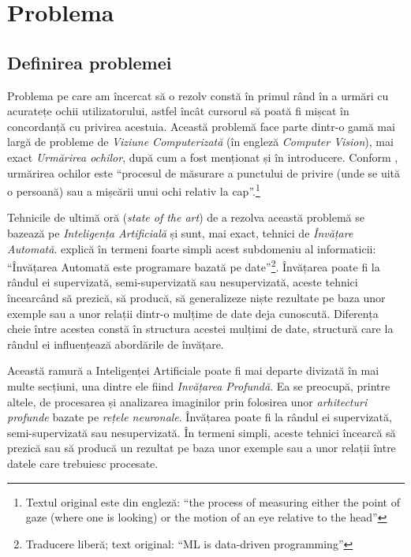 \chapter{Problema}

\section{Definirea problemei}

Problema pe care am încercat să o rezolv constă în primul rând în a urmări cu acuratețe ochii utilizatorului, astfel încât cursorul să poată fi mișcat în concordanță cu privirea acestuia.
Această problemă face parte dintr-o gamă mai largă de probleme de \emph{Viziune Computerizată} (în engleză \emph{Computer Vision}), mai exact \emph{Urmărirea ochilor}, după cum a fost menționat și în introducere.
Conform \cite{eye_tracking}, urmărirea ochilor este ``procesul de măsurare a punctului de privire (unde se uită o persoană) sau a mișcării unui ochi relativ la cap''.\footnote{Textul original este din engleză: ``the process of measuring either the point of gaze (where one is looking) or the motion of an eye relative to the head''}

Tehnicile de ultimă oră (\emph{state of the art}) de a rezolva această problemă se bazează pe \emph{Inteligența Artificială} și sunt, mai exact, tehnici de \emph{Învățare Automată}.
\cite{liviu_ciortuz_ml} explică în termeni foarte simpli acest subdomeniu al informaticii: ``Învățarea Automată este programare bazată pe date''\footnote{Traducere liberă; text original: ``ML is data-driven programming''}.
Învățarea poate fi la rândul ei supervizată, semi-supervizată sau nesupervizată, aceste tehnici încearcând să prezică, să producă, să generalizeze niște rezultate pe baza unor exemple sau a unor relații dintr-o mulțime de date deja cunoscută.
Diferența cheie între acestea constă în structura acestei mulțimi de date, structură care la rândul ei influențează abordările de învățare.

Această ramură a Inteligenței Artificiale poate fi mai departe divizată în mai multe secțiuni, una dintre ele fiind \emph{Invățarea Profundă}.
Ea se preocupă, printre altele, de procesarea și analizarea imaginilor prin folosirea unor \emph{arhitecturi profunde} bazate pe \emph{rețele neuronale}.
Învățarea poate fi la rândul ei supervizată, semi-supervizată sau nesupervizată.
În termeni simpli, aceste tehnici încearcă să prezică sau să producă un rezultat pe baza unor exemple sau a unor relații între datele care trebuiesc procesate.

